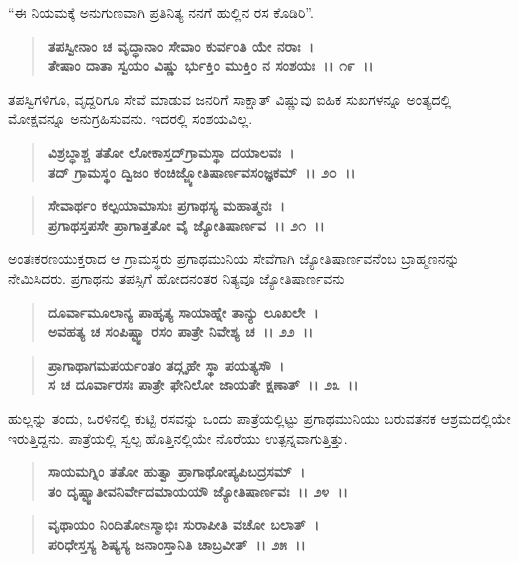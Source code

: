 “ಈ ನಿಯಮಕ್ಕೆ ಅನುಗುಣವಾಗಿ ಪ್ರತಿನಿತ್ಯ ನನಗೆ ಹುಲ್ಲಿನ ರಸ ಕೊಡಿರಿ”.

\begin{verse}
\textbf{ತಪಸ್ವೀನಾಂ ಚ ವೃದ್ಧಾನಾಂ ಸೇವಾಂ ಕುರ್ವಂತಿ ಯೇ ನರಾಃ~।}\\\textbf{ತೇಷಾಂ ದಾತಾ ಸ್ವಯಂ ವಿಷ್ಣು ರ್ಭುಕ್ತಿಂ ಮುಕ್ತಿಂ ನ ಸಂಶಯಃ~।। ೧೯~।।}
\end{verse}

ತಪಸ್ವಿಗಳಿಗೂ, ವೃದ್ದರಿಗೂ ಸೇವೆ ಮಾಡುವ ಜನರಿಗೆ ಸಾಕ್ಷಾತ್ ವಿಷ್ಣುವು ಐಹಿಕ ಸುಖಗಳನ್ನೂ ಅಂತ್ಯದಲ್ಲಿ ಮೋಕ್ಷವನ್ನೂ ಅನುಗ್ರಹಿಸುವನು. ಇದರಲ್ಲಿ ಸಂಶಯವಿಲ್ಲ.

\begin{verse}
\textbf{ವಿಶ್ರಬ್ಧಾಶ್ಚ ತತೋ ಲೋಕಾಸ್ತದ್‌ಗ್ರಾಮಸ್ಥಾ ದಯಾಲವಃ~।}\\\textbf{ತದ್ ಗ್ರಾಮಸ್ಥಂ ದ್ವಿಜಂ ಕಂಚಿಜ್ಜ್ಯೋತಿಷಾರ್ಣವಸಂಜ್ಞಕಮ್~।। ೨೦~।। }
\end{verse}

\begin{verse}
\textbf{ಸೇವಾರ್ಥಂ ಕಲ್ಪಯಾಮಾಸುಃ ಪ್ರಗಾಥಸ್ಯ ಮಹಾತ್ಮನಃ~।}\\\textbf{ಪ್ರಗಾಥಸ್ತಪಸೇ ಪ್ರಾಗಾತ್ತತೋ ವೈ ಜ್ಯೋತಿಷಾರ್ಣವ~।। ೨೧~।।}
\end{verse}

ಅಂತಃಕರಣಯುಕ್ತರಾದ ಆ ಗ್ರಾಮಸ್ಥರು ಪ್ರಗಾಥಮುನಿಯ ಸೇವೆಗಾಗಿ ಜ್ಯೋತಿಷಾರ್ಣವನೆಂಬ ಬ್ರಾಹ್ಮಣನನ್ನು ನೇಮಿಸಿದರು. ಪ್ರಗಾಥನು ತಪಸ್ಸಿಗೆ ಹೋದನಂತರ ನಿತ್ಯವೂ ಜ್ಯೋತಿಷಾರ್ಣವನು

\begin{verse}
\textbf{ದೂರ್ವಾಮೂಲಾನ್ಯ ಪಾಹೃತ್ಯ ಸಾಯಾಹ್ನೇ ತಾನ್ಯು ಲೂಖಲೇ~।}\\\textbf{ಅವಹತ್ಯ ಚ ಸಂಪಿಷ್ಟ್ವಾ ರಸಂ ಪಾತ್ರೇ ನಿವೇಶ್ಯ ಚ~।। ೨೨~।।}
\end{verse}

\begin{verse}
\textbf{ಪ್ರಾಗಾಥಾಗಮಪರ್ಯಂತಂ ತದ್ಗೃಹೇ ಸ್ಥಾ ಪಯತ್ಯಸೌ~।}\\\textbf{ಸ ಚ ದೂರ್ವಾರಸಃ ಪಾತ್ರೇ ಫೇನಿಲೋ ಜಾಯತೇ ಕ್ಷಣಾತ್~।। ೨೩~।।}
\end{verse}

ಹುಲ್ಲನ್ನು ತಂದು, ಒರಳಿನಲ್ಲಿ ಕುಟ್ಟಿ ರಸವನ್ನು ಒಂದು ಪಾತ್ರೆಯಲ್ಲಿಟ್ಟು ಪ್ರಗಾಥಮುನಿಯು ಬರುವತನಕ ಆಶ್ರಮದಲ್ಲಿಯೇ ಇರುತ್ತಿದ್ದನು. ಪಾತ್ರೆಯಲ್ಲಿ ಸ್ವಲ್ಪ ಹೊತ್ತಿನಲ್ಲಿಯೇ ನೊರೆಯು ಉತ್ಪನ್ನವಾಗುತ್ತಿತ್ತು.

\begin{verse}
\textbf{ಸಾಯಮಗ್ನಿಂ ತತೋ ಹುತ್ವಾ ಪ್ರಾಗಾಥೋಪ್ಯಪಿಬದ್ರಸಮ್~।}\\\textbf{ತಂ ದೃಷ್ಟ್ವಾತೀವನಿರ್ವೇದಮಾಯಯೌ ಜ್ಯೋತಿಷಾರ್ಣವಃ~।। ೨೪~।। }
\end{verse}

\begin{verse}
\textbf{ವೃಥಾಯಂ ನಿಂದಿತೋsಸ್ಮಾಭಿಃ ಸುರಾಪೀತಿ ವಚೋ ಬಲಾತ್~।}\\\textbf{ಪರಿಧೇಸ್ತಸ್ಯ ಶಿಷ್ಯಸ್ಯ ಜನಾಂಸ್ತಾನಿತಿ ಚಾಬ್ರವೀತ್~।। ೨೫~।।}
\end{verse}

